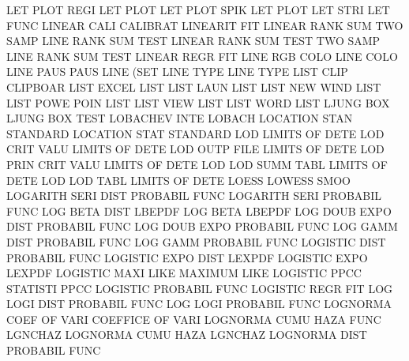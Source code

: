 LET      PLOT REGI                      LET      PLOT
LET      PLOT SPIK                      LET      PLOT
LET      STRI                           LET      FUNC
LINEAR   CALI                           CALIBRAT
LINEARIT                                FIT
LINEAR   RANK SUM                       TWO      SAMP LINE RANK SUM  TEST
LINEAR   RANK SUM  TEST                 TWO      SAMP LINE RANK SUM  TEST
LINEAR   REGR                           FIT
LINE     RGB  COLO                      LINE     COLO
LINE     PAUS                           PAUS     LINE (SET
LINE     TYPE                           LINE     TYPE
LIST     CLIP                           CLIPBOAR
LIST     EXCEL                          LIST
LIST     LAUN                           LIST
LIST     NEW  WIND                      LIST
LIST     POWE POIN                      LIST
LIST     VIEW                           LIST
LIST     WORD                           LIST
LJUNG    BOX                            LJUNG    BOX  TEST
LOBACHEV INTE                           LOBACH
LOCATION STAN                           STANDARD
LOCATION STAT                           STANDARD
LOD                                     LIMITS   OF   DETE
LOD      CRIT VALU                      LIMITS   OF   DETE
LOD      OUTP FILE                      LIMITS   OF   DETE
LOD      PRIN CRIT VALU                 LIMITS   OF   DETE
LOD      LOD  SUMM TABL                 LIMITS   OF   DETE
LOD      LOD  TABL                      LIMITS   OF   DETE
LOESS                                   LOWESS   SMOO
LOGARITH SERI DIST                      PROBABIL FUNC
LOGARITH SERI                           PROBABIL FUNC
LOG      BETA DIST                      LBEPDF
LOG      BETA                           LBEPDF
LOG      DOUB EXPO DIST                 PROBABIL FUNC
LOG      DOUB EXPO                      PROBABIL FUNC
LOG      GAMM DIST                      PROBABIL FUNC
LOG      GAMM                           PROBABIL FUNC
LOGISTIC DIST                           PROBABIL FUNC
LOGISTIC EXPO DIST                      LEXPDF
LOGISTIC EXPO                           LEXPDF
LOGISTIC MAXI LIKE                      MAXIMUM  LIKE
LOGISTIC PPCC                           STATISTI PPCC
LOGISTIC                                PROBABIL FUNC
LOGISTIC REGR                           FIT
LOG      LOGI DIST                      PROBABIL FUNC
LOG      LOGI                           PROBABIL FUNC
LOGNORMA COEF OF   VARI                 COEFFICE OF   VARI
LOGNORMA CUMU HAZA FUNC                 LGNCHAZ
LOGNORMA CUMU HAZA                      LGNCHAZ
LOGNORMA DIST                           PROBABIL FUNC
